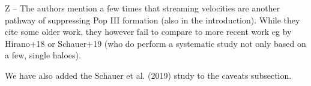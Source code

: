 \documentclass[11pt]{article}
\newenvironment{referee}[1][]{%
    \ignorespaces%
    \begin{mdframed}[style=myquotestyle,#1]%
}{%
    \end{mdframed}%
    \ignorespacesafterend%
}%
\begin{document}
\begin{referee}
Z -- The authors mention a few times that streaming velocities are another pathway of suppressing Pop III formation (also in the introduction). While they cite some older work, they however fail to compare to more recent work eg by Hirano+18 or Schauer+19 (who do perform a systematic study not only based on a few, single haloes).
\end{referee}
We have also added the Schauer et al. (2019) study to the caveats subsection.
\end{document}
